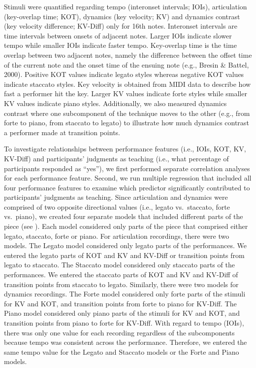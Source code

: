 \documentclass[
  man,floatsintext]{apa6}
\begin{document}
Stimuli were quantified regarding tempo (interonset intervals; IOIs), articulation (key-overlap time; KOT), dynamics (key velocity; KV) and dynamics contrast (key velocity difference; KV-Diff) only for 16th notes. Interonset intervals are time intervals between onsets of adjacent notes. Larger IOIs indicate slower tempo while smaller IOIs indicate faster tempo. Key-overlap time is the time overlap between two adjacent notes, namely the difference between the offset time of the current note and the onset time of the ensuing note (e.g., Bresin \& Battel, 2000). Positive KOT values indicate legato styles whereas negative KOT values indicate staccato styles. Key velocity is obtained from MIDI data to describe how fast a performer hit the key. Larger KV values indicate forte styles while smaller KV values indicate piano styles. Additionally, we also measured dynamics contrast where one subcomponent of the technique moves to the other (e.g., from forte to piano, from staccato to legato) to illustrate how much dynamics contrast a performer made at transition points.

To investigate relationships between performance features (i.e., IOIs, KOT, KV, KV-Diff) and participants' judgments as teaching (i.e., what percentage of participants responded as ``yes''), we first performed separate correlation analyses for each performance feature. Second, we run multiple regression that included all four performance features to examine which predictor significantly contributed to participants' judgments as teaching. Since articulation and dynamics were comprised of two opposite directional values (i.e., legato vs.~staccato, forte vs.~piano), we created four separate models that included different parts of the piece (see ). Each model considered only parts of the piece that comprised either legato, staccato, forte or piano. For articulation recordings, there were two models. The Legato model considered only legato parts of the performances. We entered the legato parts of KOT and KV and KV-Diff or transition points from legato to staccato. The Staccato model considered only staccato parts of the performances. We entered the staccato parts of KOT and KV and KV-Diff of transition points from staccato to legato. Similarly, there were two models for dynamics recordings. The Forte model considered only forte parts of the stimuli for KV and KOT, and transition points from forte to piano for KV-Diff. The Piano model considered only piano parts of the stimuli for KV and KOT, and transition points from piano to forte for KV-Diff. With regard to tempo (IOIs), there was only one value for each recording regardless of the subcomponents because tempo was consistent across the performance. Therefore, we entered the same tempo value for the Legato and Staccato models or the Forte and Piano models.
\end{document}
